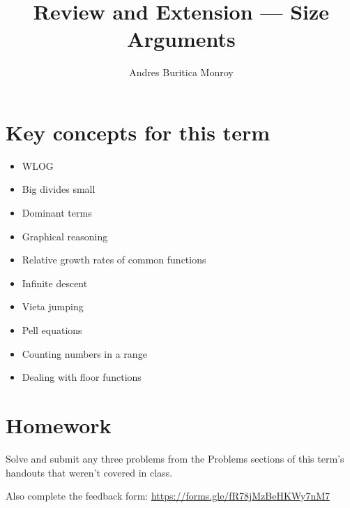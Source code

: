 \documentclass{article}
\title{Review and Extension --- Size Arguments}
\author{Andres Buritica Monroy}
\date{}
\begin{document}
\maketitle
\section{Key concepts for this term}
\begin{itemize}
	\item WLOG
	\item Big divides small
	\item Dominant terms
	\item Graphical reasoning
	\item Relative growth rates of common functions
	\item Infinite descent
	\item Vieta jumping
	\item Pell equations
	\item Counting numbers in a range
	\item Dealing with floor functions
\end{itemize}
\section{Homework}
Solve and submit any three problems from the Problems sections of this term’s handouts that
weren’t covered in class.

Also complete the feedback form: \url{https://forms.gle/fR78jMzBeHKWy7nM7}
\end{document}
